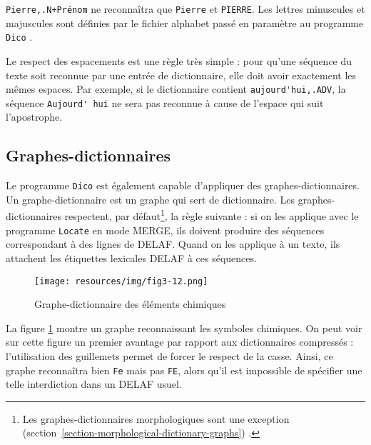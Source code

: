 \noindent \verb$Pierre,.N+Prénom$ ne reconnaîtra que \verb+Pierre+ et \verb+PIERRE+. Les lettres
minuscules et majuscules sont définies par le fichier alphabet passé en paramètre au programme
\verb+Dico+
.

\bigskip
\noindent Le respect des espacements est une règle très simple : pour qu’une séquence du texte
soit reconnue par une entrée de dictionnaire, elle doit avoir exactement les mêmes espaces.
Par exemple, si le dictionnaire contient \verb+aujourd'hui,.ADV+, la séquence \verb+Aujourd' hui+
ne sera pas reconnue à cause de l’espace qui suit l’apostrophe.


\subsection{Graphes-dictionnaires}
\label{section-dictionary-graphs}
Le programme \verb+Dico+ est également capable
d’appliquer des graphes-dictionnaires.
Un graphe-dictionnaire est un graphe qui sert de dictionnaire.
Les graphes-dictionnaires respectent,
par défaut\footnote{Les graphes-dictionnaires morphologiques sont une exception
(section~\ref{section-morphological-dictionary-graphs}) .}, la règle suivante :
si on les applique avec le programme \verb+Locate+ en mode MERGE, ils doivent produire des séquences
correspondant à des lignes de DELAF.
Quand on les applique à un texte, ils attachent les étiquettes lexicales DELAF à ces séquences.


\begin{figure}[!p]
\begin{center}
\texttt{[image: resources/img/fig3-12.png]}
\caption{Graphe-dictionnaire des éléments chimiques\label{elements}}
\end{center}
\end{figure}

\bigskip
\noindent La figure \ref{elements} montre un graphe reconnaissant les symboles chimiques. On peut
voir sur cette figure un premier avantage par rapport aux dictionnaires compressés : l’utilisation
des guillemets permet de forcer le respect de la casse. Ainsi, ce graphe reconnaîtra bien \verb+Fe+
mais pas \verb+FE+, alors qu’il est impossible de spécifier une telle interdiction dans un DELAF
usuel.

